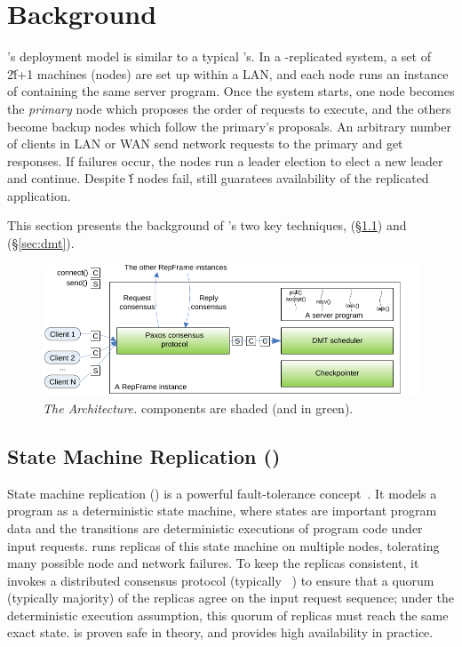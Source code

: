 \section{\repbox Background} \label{sec:background}

\repbox's deployment model is similar to a typical \smr's. In a \repbox-replicated
system, a set of 2\v{f}+1 machines (nodes) are set up within a LAN,
and each node runs an instance of \repbox containing the same server
program. Once the \repbox system starts, one node becomes the \emph{primary}
node which proposes the order of requests to execute, and the others
become backup nodes which follow the primary's proposals. An arbitrary
number of clients in LAN or WAN send network requests to the primary and
get responses.  If failures occur, the nodes run a leader election to
elect a new leader and continue. Despite \v{f} nodes fail, \repbox still 
guaratees availability of the replicated application.

This section presents the background of \repbox's two key techniques, 
\smr (\S\ref{sec:smr}) and \dmt (\S\ref{sec:dmt}).

\begin{figure}[t]
\vspace{.20in}
\centering
\includegraphics[width=.5\textwidth]{figures/arch}
\vspace{-.20in}
\caption{{\em The \repbox Architecture.} \repbox components are shaded (and in
  green).} \label{fig:repbox}
\vspace{-.05in}
\end{figure}


\subsection{State Machine Replication (\smr)} \label{sec:smr}

State machine replication (\smr) is a powerful fault-tolerance
concept~\cite{paxos:practical}.  It models a program as a deterministic state 
machine, where states are important program data and the transitions are 
deterministic executions of program code under input requests.  \smr runs 
replicas of this state machine on multiple nodes, tolerating many possible node 
and network failures.  To keep the replicas consistent, it invokes a
distributed consensus protocol (typically \paxos~\cite{paxos, paxos:simple, 
paxos:practical}) to ensure that a quorum (typically majority) of the replicas 
agree on the input request sequence; under the deterministic execution 
assumption, this quorum of replicas must reach the same exact state.  \smr is 
proven safe in theory, and provides high availability in practice.

